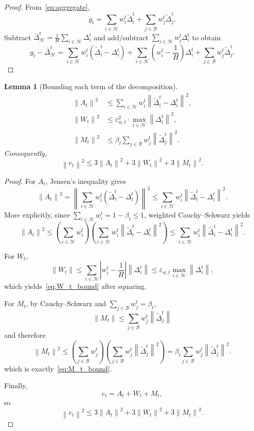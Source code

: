 \documentclass[11pt,a4paper]{article}
\newtheorem{lemma}{Lemma}
\theoremstyle{remark}
\newcommand{\HH}{\mathcal{H}}
\newcommand{\BB}{\mathcal{B}}
\newcommand{\norm}[1]{\left\lVert #1 \right\rVert}
\newcommand{\abs}[1]{\left\lvert #1 \right\rvert}
\begin{document}
\begin{proof}
From~\eqref{eq:aggregate},
\[
    g_t
    =
    \sum_{i \in \HH} w_i^t \tilde{\Delta}_i^t
    +
    \sum_{j \in \BB} w_j^t \tilde{\Delta}_j^t.
\]
Subtract \(\bar{\Delta}_{\HH}^t = \frac{1}{H}\sum_{i\in\HH}\Delta_i^t\) and
add/subtract \(\sum_{i\in\HH} w_i^t \Delta_i^t\) to obtain
\[
    g_t - \bar{\Delta}_{\HH}^t
    =
    \sum_{i \in \HH} w_i^t(\tilde{\Delta}_i^t-\Delta_i^t)
    +
    \sum_{i \in \HH}
    \left(w_i^t-\frac{1}{H}\right)\Delta_i^t
    +
    \sum_{j \in \BB} w_j^t \tilde{\Delta}_j^t.
\]
\end{proof}

\begin{lemma}[Bounding each term of the decomposition]
\label{lem:term_bounds}
\begin{align}
    \norm{A_t}^2
    &\le
    \sum_{i \in \HH} w_i^t \norm{\tilde{\Delta}_i^t-\Delta_i^t}^2,
    \label{eq:A_t_bound}\\
    \norm{W_t}^2
    &\le
    \varepsilon_{w,t}^2 \cdot \max_{i\in\HH}\norm{\Delta_i^t}^2,
    \label{eq:W_t_bound}\\
    \norm{M_t}^2
    &\le
    \beta_t \sum_{j\in\BB} w_j^t \norm{\tilde{\Delta}_j^t}^2.
    \label{eq:M_t_bound}
\end{align}
Consequently,
\begin{equation}
    \norm{e_t}^2
    \le
    3\norm{A_t}^2 + 3\norm{W_t}^2 + 3\norm{M_t}^2.
    \label{eq:e_abc}
\end{equation}
\end{lemma}

\begin{proof}
For \(A_t\), Jensen's inequality gives
\[
    \norm{A_t}^2
    =
    \left\|
        \sum_{i \in \HH} w_i^t(\tilde{\Delta}_i^t-\Delta_i^t)
    \right\|^2
    \le
    \sum_{i \in \HH} w_i^t \norm{\tilde{\Delta}_i^t-\Delta_i^t}^2.
\]
More explicitly, since \(\sum_{i\in\HH} w_i^t = 1-\beta_t \le 1\),
weighted Cauchy--Schwarz yields
\[
    \norm{A_t}^2
    \le
    \left(\sum_{i\in\HH} w_i^t\right)
    \left(\sum_{i\in\HH} w_i^t \norm{\tilde{\Delta}_i^t-\Delta_i^t}^2\right)
    \le
    \sum_{i\in\HH} w_i^t \norm{\tilde{\Delta}_i^t-\Delta_i^t}^2.
\]

For \(W_t\),
\[
    \norm{W_t}
    \le
    \sum_{i \in \HH}
    \abs{w_i^t-\frac{1}{H}} \norm{\Delta_i^t}
    \le
    \varepsilon_{w,t} \max_{i\in\HH}\norm{\Delta_i^t},
\]
which yields~\eqref{eq:W_t_bound} after squaring.

For \(M_t\), by Cauchy--Schwarz and \(\sum_{j\in\BB}w_j^t=\beta_t\),
\[
    \norm{M_t}
    \le
    \sum_{j\in\BB} w_j^t \norm{\tilde{\Delta}_j^t}
\]
and therefore
\[
    \norm{M_t}^2
    \le
    \left(\sum_{j\in\BB}w_j^t\right)
    \left(\sum_{j\in\BB}w_j^t\norm{\tilde{\Delta}_j^t}^2\right)
    =
    \beta_t\sum_{j\in\BB}w_j^t\norm{\tilde{\Delta}_j^t}^2.
\]
which is exactly~\eqref{eq:M_t_bound}.

Finally,
\[
    e_t = A_t + W_t + M_t,
\]
so
\[
    \norm{e_t}^2
    \le
    3\norm{A_t}^2 + 3\norm{W_t}^2 + 3\norm{M_t}^2.
\]
\end{proof}
\end{document}
